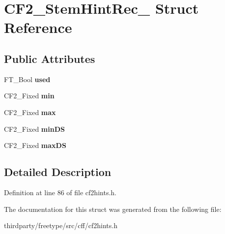 \hypertarget{struct_c_f2___stem_hint_rec__}{}\section{C\+F2\+\_\+\+Stem\+Hint\+Rec\+\_\+ Struct Reference}
\label{struct_c_f2___stem_hint_rec__}
\subsection*{Public Attributes}
\begin{DoxyCompactItemize}
\item 
\mbox{\label{struct_c_f2___stem_hint_rec___ac01ba4764ab9fcebfa3023645e9745d4}} 
F\+T\+\_\+\+Bool {\bfseries used}
\item 
\mbox{\label{struct_c_f2___stem_hint_rec___a4d81992a6202dba0105a2db9fac11ddc}} 
C\+F2\+\_\+\+Fixed {\bfseries min}
\item 
\mbox{\label{struct_c_f2___stem_hint_rec___a50a08415026879df566abc0ad5e4a7fe}} 
C\+F2\+\_\+\+Fixed {\bfseries max}
\item 
\mbox{\label{struct_c_f2___stem_hint_rec___ae693d6d9a52acee231cf46218266d661}} 
C\+F2\+\_\+\+Fixed {\bfseries min\+DS}
\item 
\mbox{\label{struct_c_f2___stem_hint_rec___a2e1d1e0e14390a433ffce68fda0a2901}} 
C\+F2\+\_\+\+Fixed {\bfseries max\+DS}
\end{DoxyCompactItemize}


\subsection{Detailed Description}


Definition at line 86 of file cf2hints.\+h.



The documentation for this struct was generated from the following file\+:\begin{DoxyCompactItemize}
\item 
thirdparty/freetype/src/cff/cf2hints.\+h\end{DoxyCompactItemize}
